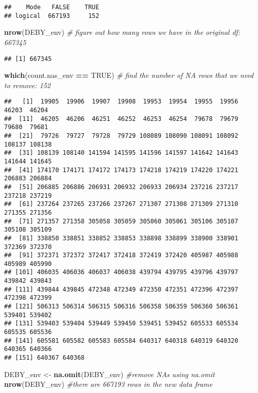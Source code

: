 \documentclass[
]{article}
\newenvironment{Shaded}{\begin{snugshade}}{\end{snugshade}}
\newcommand{\CommentTok}[1]{\textcolor[rgb]{0.56,0.35,0.01}{\textit{#1}}}
\newcommand{\ConstantTok}[1]{\textcolor[rgb]{0.56,0.35,0.01}{#1}}
\newcommand{\FunctionTok}[1]{\textcolor[rgb]{0.13,0.29,0.53}{\textbf{#1}}}
\newcommand{\NormalTok}[1]{#1}
\newcommand{\OtherTok}[1]{\textcolor[rgb]{0.56,0.35,0.01}{#1}}
\newcommand{\SpecialCharTok}[1]{\textcolor[rgb]{0.81,0.36,0.00}{\textbf{#1}}}
\begin{document}
\begin{verbatim}
##    Mode   FALSE    TRUE 
## logical  667193     152
\end{verbatim}

\begin{Shaded}
\begin{Highlighting}[]
\FunctionTok{nrow}\NormalTok{(DEBY\_env) }\CommentTok{\# figure out how many rows we have in the original df: 667345}
\end{Highlighting}
\end{Shaded}

\begin{verbatim}
## [1] 667345
\end{verbatim}

\begin{Shaded}
\begin{Highlighting}[]
\FunctionTok{which}\NormalTok{(count.nas\_env }\SpecialCharTok{==} \ConstantTok{TRUE}\NormalTok{) }\CommentTok{\# find the number of NA rows that we need to remove: 152}
\end{Highlighting}
\end{Shaded}

\begin{verbatim}
##   [1]  19905  19906  19907  19908  19953  19954  19955  19956  46203  46204
##  [11]  46205  46206  46251  46252  46253  46254  79678  79679  79680  79681
##  [21]  79726  79727  79728  79729 108089 108090 108091 108092 108137 108138
##  [31] 108139 108140 141594 141595 141596 141597 141642 141643 141644 141645
##  [41] 174170 174171 174172 174173 174218 174219 174220 174221 206883 206884
##  [51] 206885 206886 206931 206932 206933 206934 237216 237217 237218 237219
##  [61] 237264 237265 237266 237267 271307 271308 271309 271310 271355 271356
##  [71] 271357 271358 305058 305059 305060 305061 305106 305107 305108 305109
##  [81] 338850 338851 338852 338853 338898 338899 338900 338901 372369 372370
##  [91] 372371 372372 372417 372418 372419 372420 405987 405988 405989 405990
## [101] 406035 406036 406037 406038 439794 439795 439796 439797 439842 439843
## [111] 439844 439845 472348 472349 472350 472351 472396 472397 472398 472399
## [121] 506313 506314 506315 506316 506358 506359 506360 506361 539401 539402
## [131] 539403 539404 539449 539450 539451 539452 605533 605534 605535 605536
## [141] 605581 605582 605583 605584 640317 640318 640319 640320 640365 640366
## [151] 640367 640368
\end{verbatim}

\begin{Shaded}
\begin{Highlighting}[]
\NormalTok{DEBY\_env }\OtherTok{\textless{}{-}} \FunctionTok{na.omit}\NormalTok{(DEBY\_env) }\CommentTok{\#remove NAs using na.omit}
\FunctionTok{nrow}\NormalTok{(DEBY\_env) }\CommentTok{\#there are 667193 rows in the new data frame}
\end{Highlighting}
\end{Shaded}
\end{document}
